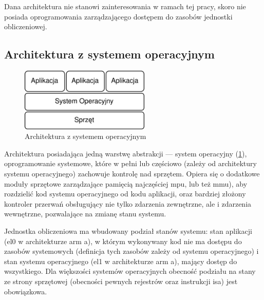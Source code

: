 \documentclass[../../main]{subfiles}
\begin{document}
Dana architektura nie stanowi zainteresowania w ramach tej pracy, skoro nie posiada oprogramowania
zarządzającego dostępem do zasobów jednostki obliczeniowej.

\subsection{Architektura z systemem operacyjnym}
\begin{figure}[h]
    \centering
    \includegraphics[width=0.55\textwidth]{Images/no-virt.png}
    \caption{Architektura z systemem operacyjnym}
    \label{fig:no-virt}
\end{figure}

Architektura posiadająca jedną warstwę abstrakcji — system operacyjny (\cref{fig:no-virt}), oprogramowanie systemowe, które w pełni lub częściowo (zależy od architektury systemu operacyjnego) zachowuje kontrolę nad sprzętem. Opiera się o dodatkowe moduły sprzętowe zarządzające pamięcią najczęściej \acrshort{mpu}, lub też \acrshort{mmu}), aby rozdzielić kod systemu operacyjnego od kodu aplikacji, oraz bardziej złożony kontroler przerwań obsługujący nie tylko zdarzenia zewnętrzne, ale i zdarzenia wewnętrzne, pozwalające na zmianę stanu systemu.

Jednostka obliczeniowa ma wbudowany podział stanów systemu: stan aplikacji (\acrshort{el}0 w architekturze \acrshort{arm} \acrshort{a}), w którym wykonywany kod nie ma dostępu do zasobów systemowych (definicja tych zasobów zależy od systemu operacyjnego) i stan systemu operacyjnego (\acrshort{el}1 w architekturze \acrshort{arm} \acrshort{a}), mający dostęp do wszystkiego. Dla większości systemów operacyjnych obecność podziału na stany ze strony sprzętowej (obecności pewnych rejestrów oraz instrukcji \acrshort{isa}) jest obowiązkowa.
\end{document}
